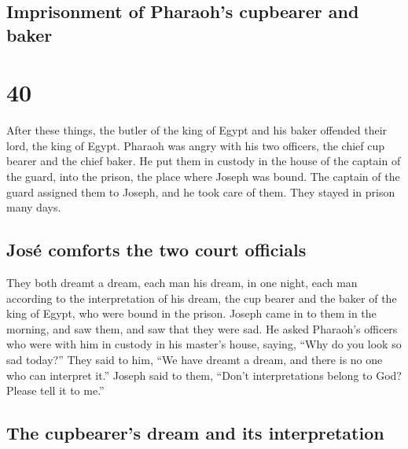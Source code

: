 \hypertarget{imprisonment-of-pharaohs-cupbearer-and-baker}{%
\subsection{Imprisonment of Pharaoh's cupbearer and
baker}\label{imprisonment-of-pharaohs-cupbearer-and-baker}}

\hypertarget{section-39}{%
\section{40}\label{section-39}}

 After these things, the butler of the king of Egypt and
his baker offended their lord, the king of Egypt.  Pharaoh
was angry with his two officers, the chief cup bearer and the chief
baker.  He put them in custody in the house of the captain
of the guard, into the prison, the place where Joseph was bound.
 The captain of the guard assigned them to Joseph, and he
took care of them. They stayed in prison many days.

\hypertarget{josuxe9-comforts-the-two-court-officials}{%
\subsection{José comforts the two court
officials}\label{josuxe9-comforts-the-two-court-officials}}

 They both dreamt a dream, each man his dream, in one
night, each man according to the interpretation of his dream, the cup
bearer and the baker of the king of Egypt, who were bound in the prison.
 Joseph came in to them in the morning, and saw them, and
saw that they were sad.  He asked Pharaoh's officers who
were with him in custody in his master's house, saying, ``Why do you
look so sad today?''  They said to him, ``We have dreamt a
dream, and there is no one who can interpret it.'' Joseph said to them,
``Don't interpretations belong to God? Please tell it to me.''

\hypertarget{the-cupbearers-dream-and-its-interpretation}{%
\subsection{The cupbearer's dream and its
interpretation}\label{the-cupbearers-dream-and-its-interpretation}}

